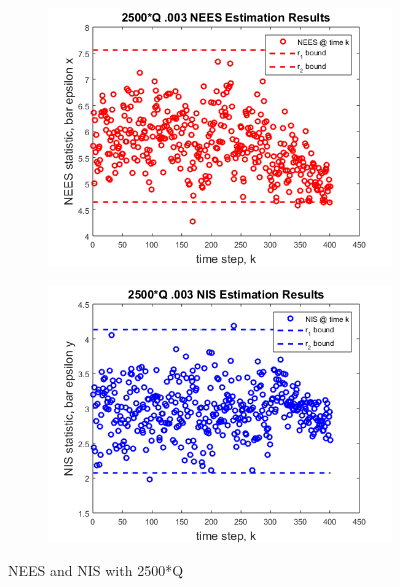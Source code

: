 \documentclass[12pt]{extarticle}
\begin{document}
{{\begin{figure}[h!]
    \begin{subfigure}[b]{0.49\textwidth}
        \centering
        \includegraphics[width=\textwidth]{Images/QFNEES.png}
    \end{subfigure}
    \begin{subfigure}[b]{0.49\textwidth}
        \centering
        \includegraphics[width=\textwidth]{Images/QFNIS.png}
    \end{subfigure}
    \caption{NEES and NIS with 2500*Q}
    \label{nissim4}
\end{figure}


}}
\end{document}
